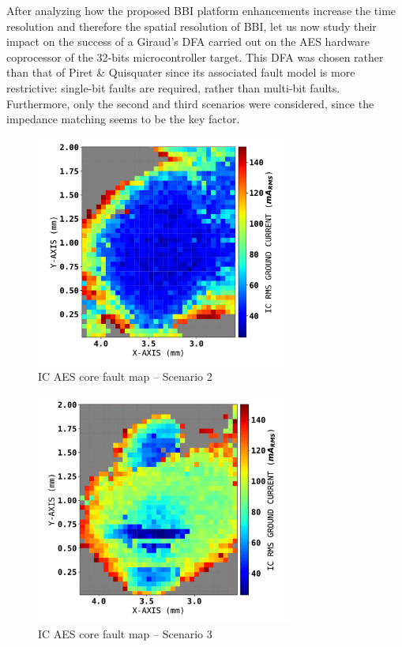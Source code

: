 \documentclass[10pt, conference, compsocconf]{IEEEtran}
\begin{document}
After analyzing how the proposed BBI platform enhancements increase the time resolution and therefore the spatial resolution of BBI, let us now study their impact on the success of a Giraud's DFA \cite{giraud} carried out on the AES hardware coprocessor of the 32-bits microcontroller target. This DFA was chosen rather than that of Piret \& Quisquater \cite{piretQuis} since its associated fault model is more restrictive: single-bit faults are required, rather than multi-bit faults.
Furthermore, only the second and third scenarios were considered, since the impedance matching seems to be the key factor.

\begin{figure}
\centering
\includegraphics[width=3.3in]{GiraudAttackGoodGnd}
\caption{IC AES core fault map – Scenario 2}
\label{aesGoodGndFault}
\end{figure}

\begin{figure}
    \centering
    \includegraphics[width=3.3in]{GiraudAttackImpMatch}
    \caption{IC AES core fault map – Scenario 3}
    \label{aesImpGndFault}
\end{figure}
\end{document}
